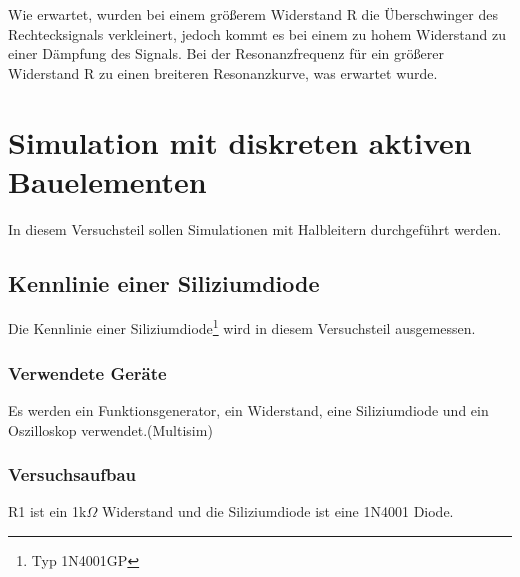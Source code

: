 \documentclass[12pt,a4paper]{article}
\begin{document}
Wie erwartet, wurden bei einem größerem Widerstand R die Überschwinger des Rechtecksignals verkleinert, jedoch kommt es bei einem zu hohem Widerstand zu einer Dämpfung des Signals. Bei der Resonanzfrequenz für ein größerer Widerstand R zu einen breiteren Resonanzkurve, was erwartet wurde.

\section{Simulation mit diskreten aktiven Bauelementen}
In diesem Versuchsteil sollen Simulationen mit Halbleitern durchgeführt werden.

\subsection{Kennlinie einer Siliziumdiode}
Die Kennlinie einer Siliziumdiode\footnote{Typ 1N4001GP} wird in diesem Versuchsteil ausgemessen.
\subsubsection{Verwendete Geräte}

Es werden ein Funktionsgenerator, ein Widerstand, eine Siliziumdiode und ein Oszilloskop verwendet.(Multisim)


\subsubsection{Versuchsaufbau}

R1 ist ein 1k$\Omega$ Widerstand und die Siliziumdiode ist eine 1N4001 Diode.
\end{document}
